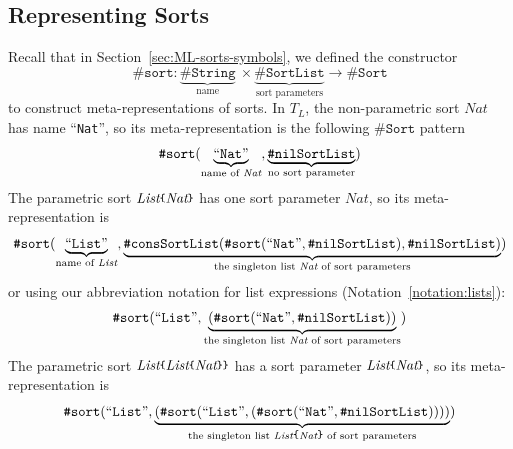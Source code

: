 \documentclass[UTF8,11pt]{article}
\theoremstyle{plain}
\theoremstyle{definition}
\theoremstyle{remark}
\newcommand{\Nat}{\textit{Nat}}
\newcommand{\List}{\textit{List}}
\newcommand{\parametric}[2]{{#1}\raisebox{.2ex}{\texttt{\footnotesize{\{}}}#2\raisebox{.2ex}{\texttt{\footnotesize{\}}}}}
\newcommand{\sharpsymbol}{\#}
\newcommand{\KString}{\texttt{\sharpsymbol String}}
\newcommand{\KSort}{\texttt{\sharpsymbol Sort}}
\newcommand{\Ksort}{\texttt{\sharpsymbol sort}}
\newcommand{\KSortList}{\texttt{\sharpsymbol SortList}}
\newcommand{\KnilKSortList}{\texttt{\sharpsymbol nilSortList}}
\newcommand{\KconsKSortList}{\texttt{\sharpsymbol consSortList}}
\newcommand{\qquottt}[1]{\textrm{``\texttt{#1}''}}
\begin{document}
\subsection{Representing Sorts}
\label{sec:represent-sorts}


Recall that in Section~\ref{sec:ML-sorts-symbols}, we defined the constructor
$$
\Ksort \colon \underbrace{\KString}_\text{name}\  \times 
\underbrace{\KSortList}_\text{sort parameters} \to \KSort
$$
to construct meta-representations of sorts.
In $T_L$, the non-parametric sort $\Nat$ has name \qquottt{Nat},
so its meta-representation is the following $\KSort$ pattern
$$
\Ksort(
	\underbrace{\qquottt{Nat}}_\text{name of $\Nat$}, 
	\underbrace{\KnilKSortList}_\text{no sort parameter})
$$
The parametric sort $\parametric{\List}{\Nat}$ has one sort parameter $\Nat$, 
so its meta-representation is
$$
\Ksort(
	\underbrace{
		\qquottt{List}}_
		\text{name of $\List$}, 
	\underbrace{
		\KconsKSortList(\Ksort(\qquottt{Nat}, \KnilKSortList),\KnilKSortList)}_
		\text{the singleton list $\Nat$ of sort parameters})
$$
or using our abbreviation notation for list expressions 
(Notation~\ref{notation:lists}):
$$
	\Ksort(
		\qquottt{List}, 
		\underbrace{(\Ksort(\qquottt{Nat},\KnilKSortList))}_
			\text{the singleton list $\Nat$ of sort parameters})
$$
The parametric sort $\parametric{\List}{\parametric{\List}{\Nat}}$ has a sort 
parameter $\parametric{\List}{\Nat}$, so its 
meta-representation is
$$ \Ksort(\qquottt{List}, \underbrace{(\Ksort(\qquottt{List}, 
(\Ksort(\qquottt{Nat},\KnilKSortList))))}_
	\text{the singleton list $\parametric{\List}{\Nat}$ of sort parameters})$$
\end{document}
